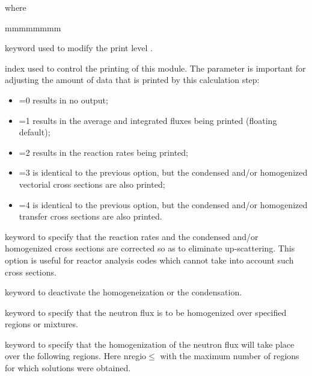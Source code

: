\noindent where

\begin{ListeDeDescription}{mmmmmmmm}

\item[\moc{EDIT}] keyword used to modify the print level .

\item[\dusa{iprint}] index used to control the printing of this module. The
 parameter is important for adjusting the amount of data that is
printed by this calculation step:

\begin{itemize}

\item {}=0 results in no output;

\item {}=1 results in the average and integrated fluxes being printed
(floating default);

\item {}=2 results in the reaction rates being printed; 

\item {}=3 is identical to the previous option, but the condensed
and/or homogenized vectorial cross sections are also printed;

\item {}=4 is identical to the previous option, but the  condensed
and/or homogenized transfer cross sections are also printed.

\end{itemize}

\item[\moc{UPS}] keyword to specify that the reaction rates and the condensed
and/or homogenized cross sections are corrected so as to eliminate
up-scattering. This option is useful for reactor analysis codes which cannot
take into account such cross sections.

\item[\moc{NONE}] keyword to deactivate the homogeneization or the condensation. 

\item[\moc{MERG}] keyword to specify that the neutron flux is to be
homogenized over specified regions or mixtures. 

\item[\moc{REGI}] keyword to specify that the homogenization of the neutron
flux will take place over the following regions. Here nregio$\le$
with  the maximum number of regions for which solutions were
obtained.


\end{ListeDeDescription}
